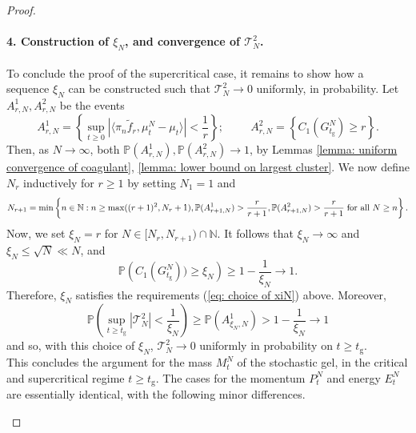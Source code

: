 \begin{proof}
       \paragraph{4. Construction of $\xi_N$, and convergence of $\mathcal{T}^2_N$.} To conclude the proof of the supercritical case, it remains to show how a sequence $\xi_N$ can be constructed such that $\mathcal{T}^2_N \rightarrow 0$ uniformly, in probability. Let $A^1_{r,N}, A^2_{r,N}$ be the events \begin{equation} \label{eq: definition of A1rn}
       A^1_{r,N}=\left\{\sup_{t\geq 0} |\langle \pi_n \widetilde{f}_r, \mu^N_t-\mu_t\rangle|<\frac{1}{r}\right\}; \hspace{1cm}
       A^2_{r,N}=\left\{C_1(G^N_{t_\mathrm{g}}) \geq r\right\}.
   \end{equation} Then, as $N\rightarrow \infty$, both $\mathbb{P}(A^1_{r,N}), \mathbb{P}(A^2_{r,N}) \rightarrow 1$, by Lemmas \ref{lemma: uniform convergence of coagulant}, \ref{lemma: lower bound on largest cluster}. We now define $N_r$ inductively for $r\geq 1$ by setting $N_1=1$ and \begin{equation}
       \label{eq: recursive definition of Nr} N_{r+1}=\min\left\{n \in \mathbb{N}: n\geq \max((r+1)^2, N_r+1),  \mathbb{P}(A^1_{r+1,N})>\frac{r}{r+1},  \mathbb{P}(A^2_{r+1,N})>\frac{r}{r+1} \hspace{0.1cm} \text{for all }N\geq n \right\}.
   \end{equation} Now, we set $\xi_N=r$ for $N\in [N_r, N_{r+1})\cap\mathbb{N}.$ It follows that $\xi_N \rightarrow \infty$ and $\xi_N\leq \sqrt{N}\ll N$, and \begin{equation}
       \mathbb{P}\left(C_1(G^N_{t_\mathrm{g}}))\geq \xi_N\right)\ge 1-\frac{1}{\xi_N} \rightarrow 1. 
   \end{equation} Therefore, $\xi_N$ satisfies the requirements (\ref{eq: choice of xiN}) above. Moreover, \begin{equation}
       \mathbb{P}\left(\sup_{t\geq t_\mathrm{g}} |\mathcal{T}^2_N| <\frac{1}{\xi_N}\right) \ge \mathbb{P}\left(A^1_{\xi_N,N}\right) > 1-\frac{1}{\xi_N}\rightarrow 1
   \end{equation} and so, with this choice of $\xi_N$, $\mathcal{T}^2_N \rightarrow 0$ uniformly in probability on $t\ge t_\mathrm{g}.$ \bigskip \\ This concludes the argument for the mass $M^N_t$ of the stochastic gel, in the critical and supercritical regime $t\ge t_\mathrm{g}$. The cases for the momentum $P^N_t$ and energy $E^N_t$ are essentially identical, with the following minor differences. \begin{enumerate}[label=\roman{*}).]

\end{enumerate}
\end{proof}
